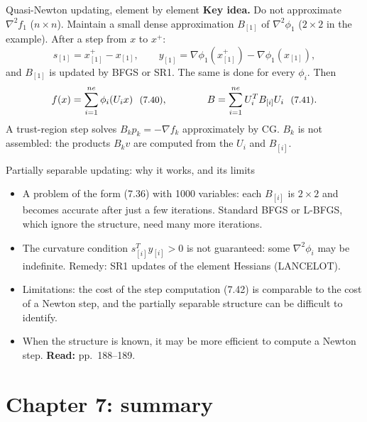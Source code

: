 \documentclass[aspectratio=169,12pt]{beamer}
\newcommand{\gradf}{\nabla f}
\newcommand{\hessf}{\nabla^{2} f}
\newcommand{\eqn}[1]{\text{\small(#1)}}
\newcommand{\readbook}[1]{{\color{red}\textbf{Read:} #1}}
\begin{document}
\begin{frame}{Quasi-Newton updating, element by element}
  \textbf{Key idea.} Do not approximate $\hessf_{1}$ ($n\times n$). Maintain a small dense
  approximation $B_{[1]}$ of $\nabla^{2}\phi_{1}$ ($2\times 2$ in the example). After a step from $x$ to $x^{+}$:
  \[
    s_{[1]}=x_{[1]}^{+}-x_{[1]},\qquad y_{[1]}=\nabla\phi_{1}(x_{[1]}^{+})-\nabla\phi_{1}(x_{[1]}),
    \tag{7.38}
  \]
  and $B_{[1]}$ is updated by BFGS or SR1. The same is done for every $\phi_{i}$. Then
  \[
    f(x)=\sum_{i=1}^{ne}\phi_{i}(U_{i}x)\ \ \eqn{7.40},
    \qquad\qquad
    B=\sum_{i=1}^{ne}U_{i}^{T}B_{[i]}U_{i}\ \ \eqn{7.41} .
  \]
  A trust-region step solves $B_{k}p_{k}=-\gradf_{k}$ \eqn{7.42} approximately by CG.
  $B_{k}$ is not assembled: the products $B_{k}v$ are computed from the $U_{i}$ and $B_{[i]}$.
\end{frame}

\begin{frame}{Partially separable updating: why it works, and its limits}
  \begin{itemize}\setlength\itemsep{0.55em}
    \item A problem of the form (7.36) with 1000 variables: each $B_{[i]}$ is $2\times 2$ and becomes
      accurate after just a few iterations. \alert{Standard BFGS or L-BFGS}, which ignore the
      structure, need many more iterations.
    \item The curvature condition $s_{[i]}^{T}y_{[i]}>0$ is not guaranteed: some $\nabla^{2}\phi_{i}$ may be
      indefinite. Remedy: SR1 updates of the element Hessians (LANCELOT).
    \item Limitations: the cost of the step computation (7.42) is comparable to the cost of
      a Newton step, and the partially separable structure can be difficult to identify.
    \item When the structure is known, it may be more efficient to compute a Newton step.
      \readbook{pp.~188--189.}
  \end{itemize}
\end{frame}

\section{Chapter 7: summary}
\end{document}
